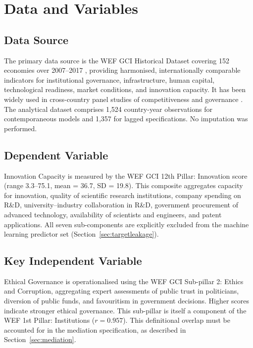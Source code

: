 \documentclass[pdflatex,sn-apa]{sn-jnl}
\begin{document}
\section{Data and Variables}
\label{sec:data}

\subsection{Data Source}

The primary data source is the WEF GCI Historical Dataset covering 152 economies over 2007--2017 \citep{wef2017}, providing harmonised, internationally comparable indicators for institutional governance, infrastructure, human capital, technological readiness, market conditions, and innovation capacity. It has been widely used in cross-country panel studies of competitiveness and governance \citep{oecd2015,worldbank2017}. The analytical dataset comprises 1,524 country-year observations for contemporaneous models and 1,357 for lagged specifications. No imputation was performed.

\subsection{Dependent Variable}

Innovation Capacity is measured by the WEF GCI 12th Pillar: Innovation score (range 3.3--75.1, mean = 36.7, SD = 19.8). This composite aggregates capacity for innovation, quality of scientific research institutions, company spending on R\&D, university--industry collaboration in R\&D, government procurement of advanced technology, availability of scientists and engineers, and patent applications. All seven sub-components are explicitly excluded from the machine learning predictor set (Section~\ref{sec:targetleakage}).

\subsection{Key Independent Variable}

Ethical Governance is operationalised using the WEF GCI Sub-pillar 2: Ethics and Corruption, aggregating expert assessments of public trust in politicians, diversion of public funds, and favouritism in government decisions. Higher scores indicate stronger ethical governance. This sub-pillar is itself a component of the WEF 1st Pillar: Institutions ($r=0.957$). This definitional overlap must be accounted for in the mediation specification, as described in Section~\ref{sec:mediation}.
\end{document}
